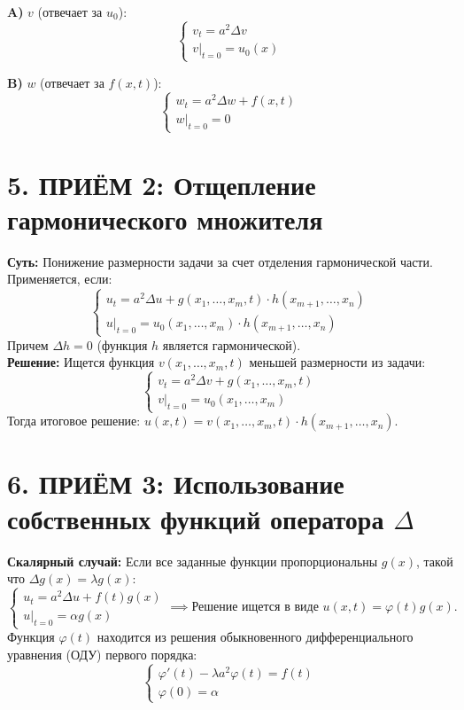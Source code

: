\vspace{0.2cm}
\noindent
\begin{minipage}{0.45\textwidth}
\textbf{A)} $v$ (отвечает за $u_0$): 
\[ \begin{cases} v_t = a^2\Delta v \\ v|_{t=0} = u_0(x) \end{cases} \]
\end{minipage}
\hfill
\begin{minipage}{0.45\textwidth}
\textbf{B)} $w$ (отвечает за $f(x,t)$): 
\[ \begin{cases} w_t = a^2\Delta w + f(x,t) \\ w|_{t=0} = 0 \end{cases} \]
\end{minipage}

\section{5. ПРИЁМ 2: Отщепление гармонического множителя}
\textbf{Суть:} Понижение размерности задачи за счет отделения гармонической части. Применяется, если:
\[
\begin{cases} 
u_t = a^2 \Delta u + g(x_1, \dots, x_m, t) \cdot h(x_{m+1}, \dots, x_n) \\ 
u|_{t=0} = u_0(x_1, \dots, x_m) \cdot h(x_{m+1}, \dots, x_n) 
\end{cases}
\]
Причем $\Delta h = 0$ (функция $h$ является гармонической). \\
\textbf{Решение:} Ищется функция $v(x_1, \dots, x_m, t)$ меньшей размерности из задачи: 
\[
\begin{cases} v_t = a^2 \Delta v + g(x_1, \dots, x_m, t) \\ v|_{t=0} = u_0(x_1, \dots, x_m) \end{cases}
\]
Тогда итоговое решение: $u(x, t) = v(x_1, \dots, x_m, t) \cdot h(x_{m+1}, \dots, x_n)$.

\section{6. ПРИЁМ 3: Использование собственных функций оператора $\Delta$}
\textbf{Скалярный случай:} Если все заданные функции пропорциональны $g(x)$, такой что $\Delta g(x) = \lambda g(x)$: 
\[
\begin{cases} 
u_t = a^2 \Delta u + f(t)g(x) \\ 
u|_{t=0} = \alpha g(x) 
\end{cases} 
\implies \text{Решение ищется в виде } u(x,t) = \varphi(t)g(x).
\]
Функция $\varphi(t)$ находится из решения обыкновенного дифференциального уравнения (ОДУ) первого порядка:
\[ \begin{cases} \varphi'(t) - \lambda a^2 \varphi(t) = f(t) \\ \varphi(0) = \alpha \end{cases} \]

